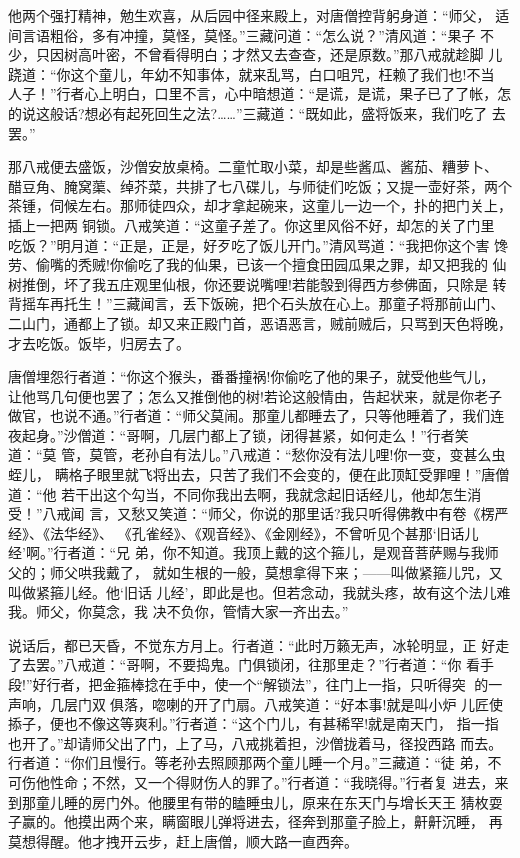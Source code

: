他两个强打精神，勉生欢喜，从后园中径来殿上，对唐僧控背躬身道：“师父，
适间言语粗俗，多有冲撞，莫怪，莫怪。”三藏问道：“怎么说？”清风道：“果子
不少，只因树高叶密，不曾看得明白；才然又去查查，还是原数。”那八戒就趁脚
儿跷道：“你这个童儿，年幼不知事体，就来乱骂，白口咀咒，枉赖了我们也!不当
人子！”行者心上明白，口里不言，心中暗想道：“是谎，是谎，果子已了了帐，怎
的说这般话?想必有起死回生之法?……”三藏道：“既如此，盛将饭来，我们吃了
去罢。”

那八戒便去盛饭，沙僧安放桌椅。二童忙取小菜，却是些酱瓜、酱茄、糟萝卜、
醋豆角、腌窝蕖、绰芥菜，共排了七八碟儿，与师徒们吃饭；又提一壶好茶，两个
茶锺，伺候左右。那师徒四众，却才拿起碗来，这童儿一边一个，扑的把门关上，
插上一把两铜锁。八戒笑道：“这童子差了。你这里风俗不好，却怎的关了门里
吃饭？”明月道：“正是，正是，好歹吃了饭儿开门。”清风骂道：“我把你这个害
馋劳、偷嘴的秃贼!你偷吃了我的仙果，已该一个擅食田园瓜果之罪，却又把我的
仙树推倒，坏了我五庄观里仙根，你还要说嘴哩!若能彀到得西方参佛面，只除是
转背摇车再托生！”三藏闻言，丢下饭碗，把个石头放在心上。那童子将那前山门、
二山门，通都上了锁。却又来正殿门首，恶语恶言，贼前贼后，只骂到天色将晚，
才去吃饭。饭毕，归房去了。

唐僧埋怨行者道：“你这个猴头，番番撞祸!你偷吃了他的果子，就受他些气儿，
让他骂几句便也罢了；怎么又推倒他的树!若论这般情由，告起状来，就是你老子
做官，也说不通。”行者道：“师父莫闹。那童儿都睡去了，只等他睡着了，我们连
夜起身。”沙僧道：“哥啊，几层门都上了锁，闭得甚紧，如何走么！”行者笑道：“莫
管，莫管，老孙自有法儿。”八戒道：“愁你没有法儿哩!你一变，变甚么虫蛭儿，
瞒格子眼里就飞将出去，只苦了我们不会变的，便在此顶缸受罪哩！”唐僧道：“他
若干出这个勾当，不同你我出去啊，我就念起旧话经儿，他却怎生消受！”八戒闻
言，又愁又笑道：“师父，你说的那里话?我只听得佛教中有卷《楞严经》、《法华经》、
《孔雀经》、《观音经》、《金刚经》，不曾听见个甚那‘旧话儿经’啊。”行者道：“兄
弟，你不知道。我顶上戴的这个箍儿，是观音菩萨赐与我师父的；师父哄我戴了，
就如生根的一般，莫想拿得下来；——叫做紧箍儿咒，又叫做紧箍儿经。他‘旧话
儿经’，即此是也。但若念动，我就头疼，故有这个法儿难我。师父，你莫念，我
决不负你，管情大家一齐出去。”

说话后，都已天昏，不觉东方月上。行者道：“此时万籁无声，冰轮明显，正
好走了去罢。”八戒道：“哥啊，不要捣鬼。门俱锁闭，往那里走？”行者道：“你
看手段!”好行者，把金箍棒捻在手中，使一个“解锁法”，往门上一指，只听得突
的一声响，几层门双俱落，唿喇的开了门扇。八戒笑道：“好本事!就是叫小炉
儿匠使掭子，便也不像这等爽利。”行者道：“这个门儿，有甚稀罕!就是南天门，
指一指也开了。”却请师父出了门，上了马，八戒挑着担，沙僧拢着马，径投西路
而去。行者道：“你们且慢行。等老孙去照顾那两个童儿睡一个月。”三藏道：“徒
弟，不可伤他性命；不然，又一个得财伤人的罪了。”行者道：“我晓得。”行者复
进去，来到那童儿睡的房门外。他腰里有带的瞌睡虫儿，原来在东天门与增长天王
猜枚耍子赢的。他摸出两个来，瞒窗眼儿弹将进去，径奔到那童子脸上，鼾鼾沉睡，
再莫想得醒。他才拽开云步，赶上唐僧，顺大路一直西奔。

